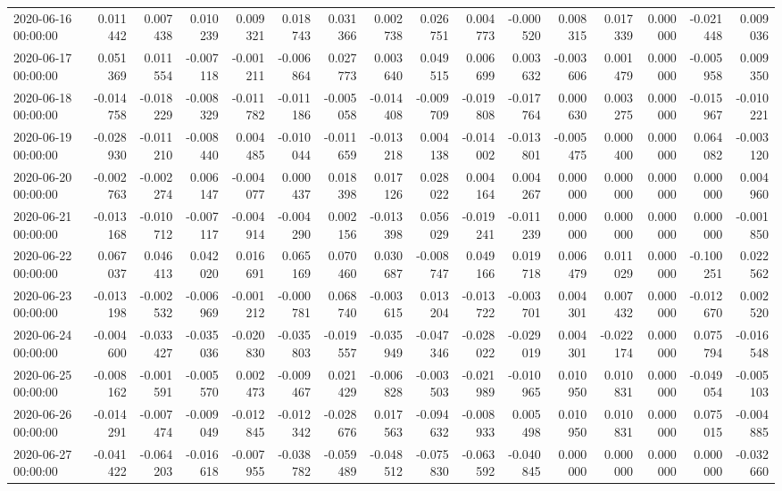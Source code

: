 \begin{tabular}{lrrrrrrrrrrrrrrr}
2020-06-16 00:00:00 & 0.011442 & 0.007438 & 0.010239 & 0.009321 & 0.018743 & 0.031366 & 0.002738 & 0.026751 & 0.004773 & -0.000520 & 0.008315 & 0.017339 & 0.000000 & -0.021448 & 0.009036 \\
2020-06-17 00:00:00 & 0.051369 & 0.011554 & -0.007118 & -0.001211 & -0.006864 & 0.027773 & 0.003640 & 0.049515 & 0.006699 & 0.003632 & -0.003606 & 0.001479 & 0.000000 & -0.005958 & 0.009350 \\
2020-06-18 00:00:00 & -0.014758 & -0.018229 & -0.008329 & -0.011782 & -0.011186 & -0.005058 & -0.014408 & -0.009709 & -0.019808 & -0.017764 & 0.000630 & 0.003275 & 0.000000 & -0.015967 & -0.010221 \\
2020-06-19 00:00:00 & -0.028930 & -0.011210 & -0.008440 & 0.004485 & -0.010044 & -0.011659 & -0.013218 & 0.004138 & -0.014002 & -0.013801 & -0.005475 & 0.000400 & 0.000000 & 0.064082 & -0.003120 \\
2020-06-20 00:00:00 & -0.002763 & -0.002274 & 0.006147 & -0.004077 & 0.000437 & 0.018398 & 0.017126 & 0.028022 & 0.004164 & 0.004267 & 0.000000 & 0.000000 & 0.000000 & 0.000000 & 0.004960 \\
2020-06-21 00:00:00 & -0.013168 & -0.010712 & -0.007117 & -0.004914 & -0.004290 & 0.002156 & -0.013398 & 0.056029 & -0.019241 & -0.011239 & 0.000000 & 0.000000 & 0.000000 & 0.000000 & -0.001850 \\
2020-06-22 00:00:00 & 0.067037 & 0.046413 & 0.042020 & 0.016691 & 0.065169 & 0.070460 & 0.030687 & -0.008747 & 0.049166 & 0.019718 & 0.006479 & 0.011029 & 0.000000 & -0.100251 & 0.022562 \\
2020-06-23 00:00:00 & -0.013198 & -0.002532 & -0.006969 & -0.001212 & -0.000781 & 0.068740 & -0.003615 & 0.013204 & -0.013722 & -0.003701 & 0.004301 & 0.007432 & 0.000000 & -0.012670 & 0.002520 \\
2020-06-24 00:00:00 & -0.004600 & -0.033427 & -0.035036 & -0.020830 & -0.035803 & -0.019557 & -0.035949 & -0.047346 & -0.028022 & -0.029019 & 0.004301 & -0.022174 & 0.000000 & 0.075794 & -0.016548 \\
2020-06-25 00:00:00 & -0.008162 & -0.001591 & -0.005570 & 0.002473 & -0.009467 & 0.021429 & -0.006828 & -0.003503 & -0.021989 & -0.010965 & 0.010950 & 0.010831 & 0.000000 & -0.049054 & -0.005103 \\
2020-06-26 00:00:00 & -0.014291 & -0.007474 & -0.009049 & -0.012845 & -0.012342 & -0.028676 & 0.017563 & -0.094632 & -0.008933 & 0.005498 & 0.010950 & 0.010831 & 0.000000 & 0.075015 & -0.004885 \\
2020-06-27 00:00:00 & -0.041422 & -0.064203 & -0.016618 & -0.007955 & -0.038782 & -0.059489 & -0.048512 & -0.075830 & -0.063592 & -0.040845 & 0.000000 & 0.000000 & 0.000000 & 0.000000 & -0.032660 \\

\end{tabular}
